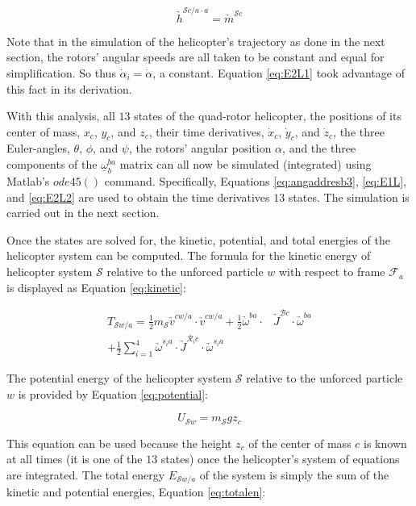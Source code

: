 \documentclass[journal]{IEEEtran}
\begin{document}
\begin{equation}
\underrightarrow{h}^{\mathcal{S}c/a \cdot a}=\underrightarrow{m}^{\mathcal{S}c}
\label{eq:E2L2}
\end{equation}

Note that in the simulation of the helicopter's trajectory as done in the next section, the rotors' angular speeds are all taken to be constant and equal for simplification. So thus $\dot{\alpha}_i=\dot{\alpha}$, a constant. Equation \ref{eq:E2L1} took advantage of this fact in its derivation.

With this analysis, all $13$ states of the quad-rotor helicopter, the positions of its center of mass, $x_c$, $y_c$, and $z_c$, their time derivatives, $\dot{x}_c$, $\dot{y}_c$, and $\dot{z}_c$, the three Euler-angles, $\theta$, $\phi$, and $\psi$, the rotors' angular position $\alpha$, and the three components of the $\underline{\omega}^{ba}_b$ matrix can all now be simulated (integrated) using Matlab's $ode45()$ command. Specifically, Equations \ref{eq:angaddresb3}, \ref{eq:E1L}, and \ref{eq:E2L2} are used to obtain the time derivatives $13$ states. The simulation is carried out in the next section. 

Once the states are solved for, the kinetic, potential, and total energies of the helicopter system can be computed. The formula for the kinetic energy of helicopter system $\mathcal{S}$ relative to the unforced particle $w$ with respect to frame $\mathcal{F}_a$ is displayed as Equation \ref{eq:kinetic}:

\begin{align}
T_{\mathcal{S}w/a}=\frac{1}{2}m_{\mathcal{S}}\underrightarrow{v}^{cw/a} \cdot \underrightarrow{v}^{cw/a}+\frac{1}{2}\underrightarrow{\omega}^{ba} \cdot& \underrightarrow{J}^{\mathcal{B}c} \cdot \underrightarrow{\omega}^{ba}\\+\frac{1}{2}\sum_{i=1}^{4}\underrightarrow{\omega}^{s_ia} \cdot \underrightarrow{J}^{\mathcal{R}_ic} \cdot \underrightarrow{\omega}^{s_ia}
\label{eq:kinetic}
\end{align}

The potential energy of the helicopter system $\mathcal{S}$ relative to the unforced particle $w$ is provided by Equation \ref{eq:potential}:

\begin{equation}
U_{\mathcal{S}w}=m_{\mathcal{S}}gz_c
\label{eq:potential}
\end{equation}

This equation can be used because the height $z_c$ of the center of mass $c$ is known at all times (it is one of the $13$ states) once the helicopter's system of equations are integrated. The total energy $E_{\mathcal{S}w/a}$ of the system is simply the sum of the kinetic and potential energies, Equation \ref{eq:totalen}:
\end{document}
